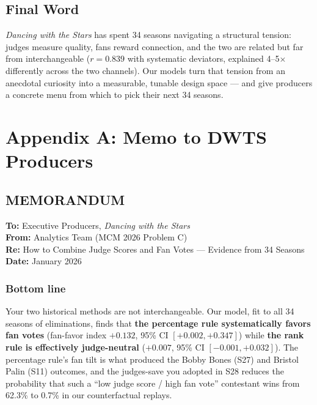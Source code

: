 \documentclass{article}
\begin{document}
\subsection{Final Word}

\emph{Dancing with the Stars} has spent 34 seasons navigating a structural tension: judges measure quality, fans reward connection, and the two are related but far from interchangeable ($r = 0.839$ with systematic deviators, explained 4--5$\times$ differently across the two channels). Our models turn that tension from an anecdotal curiosity into a measurable, tunable design space --- and give producers a concrete menu from which to pick their next 34 seasons.

\newpage
\section*{Appendix A: Memo to DWTS Producers}

\subsection*{\textbf{MEMORANDUM}}

\textbf{To:} Executive Producers, \emph{Dancing with the Stars} \\
\textbf{From:} Analytics Team (MCM 2026 Problem C) \\
\textbf{Re:} How to Combine Judge Scores and Fan Votes --- Evidence from 34 Seasons \\
\textbf{Date:} January 2026

\subsubsection*{Bottom line}
Your two historical methods are not interchangeable. Our model, fit to all 34 seasons of eliminations, finds that \textbf{the percentage rule systematically favors fan votes} (fan-favor index $+0.132$, 95\% CI $[+0.002, +0.347]$) while \textbf{the rank rule is effectively judge-neutral} ($+0.007$, 95\% CI $[-0.001, +0.032]$). The percentage rule's fan tilt is what produced the Bobby Bones (S27) and Bristol Palin (S11) outcomes, and the judges-save you adopted in S28 reduces the probability that such a ``low judge score / high fan vote'' contestant wins from 62.3\% to 0.7\% in our counterfactual replays.
\end{document}
